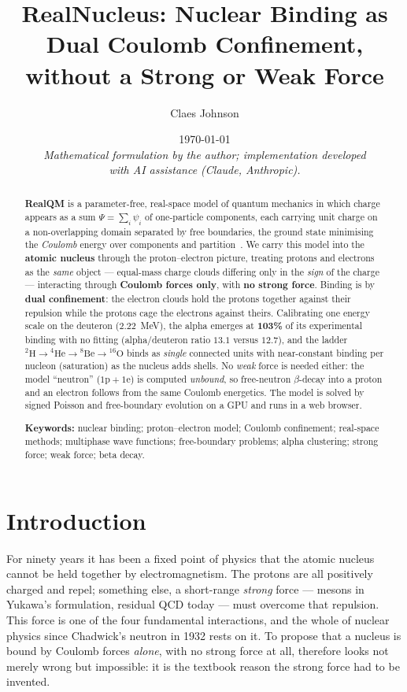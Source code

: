 \documentclass[11pt]{article}
\title{RealNucleus: Nuclear Binding as Dual Coulomb Confinement,\\ without a Strong or Weak Force}
\author[1]{Claes Johnson}
\affil[1]{KTH Royal Institute of Technology, SE-100 44 Stockholm, Sweden \\
\texttt{claesjohnson@gmail.com}}
\date{\today \\[0.4em]
\small\textit{Mathematical formulation by the author; implementation developed} \\
\small\textit{with AI assistance (Claude, Anthropic).}}
\begin{document}
\maketitle

\begin{abstract}
\textbf{RealQM} is a parameter-free, real-space model of quantum mechanics in which charge
appears as a sum $\Psi=\sum_i\psi_i$ of one-particle components, each carrying unit charge on a
non-overlapping domain separated by free boundaries, the ground state minimising the
\emph{Coulomb} energy over components and partition~\cite{Johnson-RealQM,Johnson-Book,Johnson-Atoms}.
We carry this model into the \textbf{atomic nucleus} through the proton--electron picture,
treating protons and electrons as the \emph{same} object --- equal-mass charge clouds
differing only in the \emph{sign} of the charge --- interacting through \textbf{Coulomb forces
only}, with \textbf{no strong force}. Binding is by \textbf{dual confinement}: the electron
clouds hold the protons together against their repulsion while the protons cage the electrons
against theirs. Calibrating one energy scale on the deuteron ($2.22$~MeV), the alpha emerges at
\textbf{103\%} of its experimental binding with no fitting (alpha/deuteron ratio $13.1$ versus
$12.7$), and the ladder $^2\mathrm{H}\to{}^4\mathrm{He}\to{}^8\mathrm{Be}\to{}^{16}\mathrm{O}$
binds as \emph{single} connected units with near-constant binding per nucleon (saturation) as the
nucleus adds shells. No \emph{weak} force is needed either: the model ``neutron''
($\mathrm{1p}+\mathrm{1e}$) is computed \emph{unbound}, so free-neutron $\beta$-decay into a
proton and an electron follows from the same Coulomb energetics. The model is solved by signed
Poisson and free-boundary evolution on a GPU and runs in a web browser.

\medskip
\noindent\textbf{Keywords:} nuclear binding; proton--electron model; Coulomb confinement;
real-space methods; multiphase wave functions; free-boundary problems; alpha clustering;
strong force; weak force; beta decay.
\end{abstract}

\section{Introduction}

For ninety years it has been a fixed point of physics that the atomic nucleus cannot be held
together by electromagnetism. The protons are all positively charged and repel; something else,
a short-range \emph{strong} force --- mesons in Yukawa's formulation, residual QCD today --- must
overcome that repulsion. This force is one of the four fundamental interactions, and the whole of
nuclear physics since Chadwick's neutron in 1932 rests on it. To propose that a nucleus is bound
by Coulomb forces \emph{alone}, with no strong force at all, therefore looks not merely wrong but
impossible: it is the textbook reason the strong force had to be invented.
\end{document}
